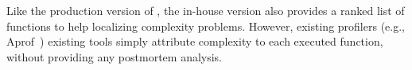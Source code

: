 Like the production version of \Tool, the in-house version also provides a 
ranked list of functions to help localizing complexity problems.
However, existing profilers (e.g., Aprof~\cite{Aprof1,Aprof2})  
existing tools simply attribute complexity to each executed function, 
without providing any postmortem analysis. 




